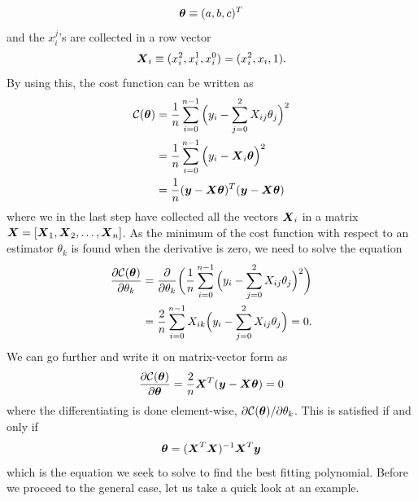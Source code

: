 \begin{equation}
\boldsymbol{{\theta}}\equiv(a,b,c)^T
\end{equation}
and the $x_i^j$'s are collected in a row vector
\begin{equation}
\boldsymbol{{X}}_i\equiv(x_i^2, x_i^1, x_i^0)=(x_i^2, x_i, 1).
\end{equation}
By using this, the cost function can be written as
\begin{equation}
\begin{aligned}
\mathcal{C}(\boldsymbol{{\theta}})&=\frac{1}{n}\sum_{i=0}^{n-1}\Big(y_i-\sum_{j=0}^2X_{ij}\theta_j\Big)^2\\
&=\frac{1}{n}\sum_{i=0}^{n-1}\Big(y_i-\boldsymbol{{X}}_i\boldsymbol{{\theta}}\Big)^2\\
&=\frac{1}{n}(\boldsymbol{{y}}-\boldsymbol{{X}}\boldsymbol{{\theta}})^T(\boldsymbol{{y}}-\boldsymbol{{X}}\boldsymbol{{\theta}})
\end{aligned}
\label{eq:polynomialcost}
\end{equation}
where we in the last step have collected all the vectors $\boldsymbol{{X}}_i$ in a matrix $\boldsymbol{{X}}=[\boldsymbol{{X}}_1,\boldsymbol{{X}}_2,\hdots,\boldsymbol{{X}}_n]$. As the minimum of the cost function with respect to an estimator $\theta_k$ is found when the derivative is zero, we need to solve the equation
\begin{equation}
\begin{aligned}
\frac{\partial \mathcal{C}(\boldsymbol{{\theta}})}{\partial\theta_k} &=\frac{\partial}{\partial\theta_k}\bigg(\frac{1}{n}\sum_{i=0}^{n-1}\Big(y_i-\sum_{j=0}^2X_{ij}\theta_j\Big)^2\bigg)\\
&=\frac{2}{n}\sum_{i=0}^{n-1}X_{ik}\Big(y_i-\sum_{j=0}^2X_{ij}\theta_j\Big)=0.
\end{aligned}
\end{equation}
We can go further and write it on matrix-vector form as
\begin{equation}
\frac{\partial \mathcal{C}(\boldsymbol{{\theta}})}{\partial\boldsymbol{{\theta}}}=\frac{2}{n}\boldsymbol{{X}}^T(\boldsymbol{{y}}-\boldsymbol{{X}}\boldsymbol{{\theta}})=0
\end{equation}
where the differentiating is done element-wise, $\partial\mathcal{C(\boldsymbol{{\theta}})}/\partial\theta_k$. This is satisfied if and only if
\begin{equation}
\boldsymbol{{\theta}}=(\boldsymbol{{X}}^T\boldsymbol{{X}})^{-1}\boldsymbol{{X}}^T\boldsymbol{{y}}
\label{eq:polynomialestimators}
\end{equation}
which is the equation we seek to solve to find the best fitting polynomial. Before we proceed to the general case, let us take a quick look at an example.

